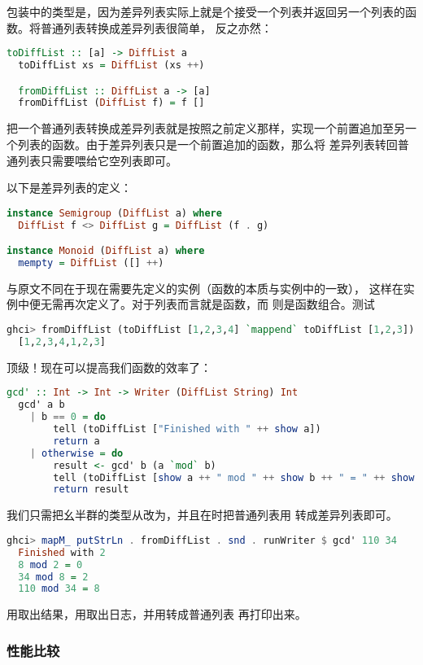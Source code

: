 \documentclass[./main.tex]{subfiles}
\begin{document}
包装中的类型是\acode{[a] -> [a]}，因为差异列表实际上就是个接受一个列表并返回另一个列表的函数。将普通列表转换成差异列表很简单，
反之亦然：

\begin{lstlisting}[language=Haskell]
  toDiffList :: [a] -> DiffList a
  toDiffList xs = DiffList (xs ++)

  fromDiffList :: DiffList a -> [a]
  fromDiffList (DiffList f) = f []
\end{lstlisting}

把一个普通列表转换成差异列表就是按照之前定义那样，实现一个前置追加至另一个列表的函数。由于差异列表只是一个前置追加的函数，那么将
差异列表转回普通列表只需要喂给它空列表即可。

以下是差异列表的定义：

\begin{lstlisting}[language=Haskell]
instance Semigroup (DiffList a) where
  DiffList f <> DiffList g = DiffList (f . g)

instance Monoid (DiffList a) where
  mempty = DiffList ([] ++)
\end{lstlisting}

与原文不同在于现在需要先定义的实例（\acode{<>}函数的本质与实例中的一致），
这样在实例中便无需再次定义了。对于列表而言就是函数，而
则是函数组合。测试

\begin{lstlisting}[language=Haskell]
  ghci> fromDiffList (toDiffList [1,2,3,4] `mappend` toDiffList [1,2,3])
  [1,2,3,4,1,2,3]
\end{lstlisting}

顶级！现在可以提高我们函数的效率了：

\begin{lstlisting}[language=Haskell]
  gcd' :: Int -> Int -> Writer (DiffList String) Int
  gcd' a b
    | b == 0 = do
        tell (toDiffList ["Finished with " ++ show a])
        return a
    | otherwise = do
        result <- gcd' b (a `mod` b)
        tell (toDiffList [show a ++ " mod " ++ show b ++ " = " ++ show (a `mod` b)])
        return result
\end{lstlisting}

我们只需把幺半群的类型从\acode{[String]}改为，并且在时把普通列表用
转成差异列表即可。

\begin{lstlisting}[language=Haskell]
  ghci> mapM_ putStrLn . fromDiffList . snd . runWriter $ gcd' 110 34
  Finished with 2
  8 mod 2 = 0
  34 mod 8 = 2
  110 mod 34 = 8
\end{lstlisting}

用取出结果，用取出日志，并用转成普通列表
再打印出来。

\subsubsection*{性能比较}

\end{document}
